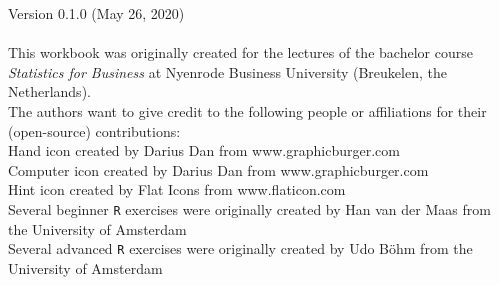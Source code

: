 \thispagestyle{emptyhead}

\vspace*{\fill} 

{\fontsize{8}{10}\selectfont

Version 0.1.0 (May 26, 2020) \\
\\
This workbook was originally created for the lectures of the bachelor course \textit{Statistics for Business} at Nyenrode Business University (Breukelen, the Netherlands). \\

The authors want to give credit to the following people or affiliations for their (open-source) contributions: \\

Hand icon created by Darius Dan from www.graphicburger.com \\
Computer icon created by Darius Dan from www.graphicburger.com \\
Hint icon created by Flat Icons from www.flaticon.com \\
Several beginner \texttt{R} exercises were originally created by Han van der Maas from the University of Amsterdam \\
Several advanced \texttt{R} exercises were originally created by Udo B{\"o}hm from the University of Amsterdam

}

\clearpage %
